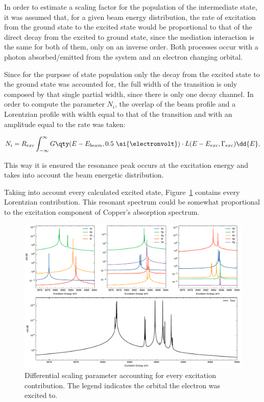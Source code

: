 In order to estimate a scaling factor for the population of the intermediate state, it was assumed that, for a given beam energy distribution, the rate of excitation from the ground state to the excited state would be proportional to that of the direct decay from the excited to ground state, since the mediation interaction is the same for both of them, only on an inverse order. Both processes occur with a photon absorbed/emitted  from the system and an electron changing orbital.

Since for the purpose of  state population only the decay from the excited state to the ground state was accounted for, the full width of the transition is only composed by that single partial width, since there is only one decay channel. In order to compute the parameter $N_i$, the overlap of the beam profile and a Lorentzian profile with width equal to that of the transition and with an amplitude equal to the rate was taken:

\begin{equation}
    N_i =R_{exc} \int_{-\infty}^\infty G\qty(E-E_{beam},0.5\ \si{\electronvolt})\cdot L(E-E_{exc},\Gamma_{exc}) \dd{E},
\end{equation}

This way it is ensured the resonance peak occurs at the excitation energy and takes into account the beam energetic distribution.

Taking into account every calculated excited state, Figure~\ref{fig:absorption} contains every Lorentzian contribution. This resonant spectrum could be somewhat proportional to the excitation component of Copper's absorption spectrum. 


\begin{figure}[h!]
    \centering
    \includegraphics[width=\linewidth]{Chapters/Figures/Chapter4/absorption.pdf}
    \caption{Differential scaling parameter accounting for every excitation contribution. The legend indicates the orbital the electron was excited to.}\label{fig:absorption}
\end{figure}

